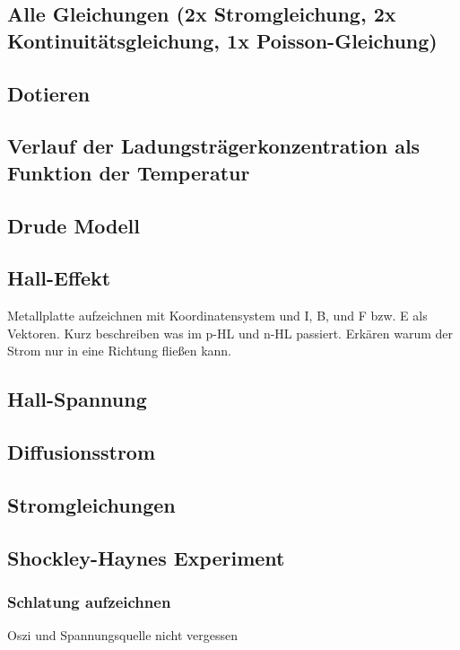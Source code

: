 \documentclass{article}
\begin{document}
\subsection{Alle Gleichungen (2x Stromgleichung, 2x Kontinuitätsgleichung, 1x Poisson-Gleichung)}\label{k3:alleGleichungen}

\subsection{Dotieren}\label{k3:dotieren}

\subsection{Verlauf der Ladungstr\"agerkonzentration als Funktion der Temperatur}\label{k3:ladungstraegerkonz}

\subsection{Drude Modell}\label{k3:drude}

\subsection{Hall-Effekt}\label{k3:halleffekt}
Metallplatte aufzeichnen mit Koordinatensystem und I, B, und F bzw. E als Vektoren.
Kurz beschreiben was im p-HL und n-HL passiert.
Erk\"aren warum der Strom nur in eine Richtung flie{\ss}en kann.

\subsection{Hall-Spannung}\label{k3:hallspannung}

\subsection{Diffusionsstrom}\label{k3:diffusionsstrom}

\subsection{Stromgleichungen}\label{k3:stromgleichungen}

\subsection{Shockley-Haynes Experiment}\label{k3:shockleyhaynes}
    \subsubsection{Schlatung aufzeichnen} Oszi und Spannungsquelle nicht vergessen
\end{document}
